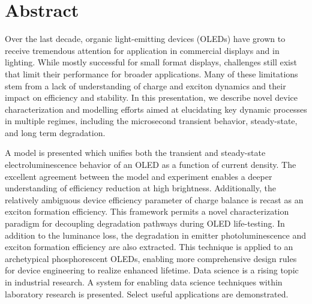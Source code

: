 \documentclass[../thesis.tex]{subfiles}
\begin{document}
\section*{Abstract}

Over the last decade, organic light-emitting devices (OLEDs) have grown to receive tremendous attention for application in commercial displays and in lighting.  While mostly successful for small format displays, challenges still exist that limit their performance for broader applications.  Many of these limitations stem from a lack of understanding of charge and exciton dynamics and their impact on efficiency and stability.  In this presentation, we describe novel device characterization and modelling efforts aimed at elucidating key dynamic processes in multiple regimes, including the microsecond transient behavior, steady-state, and long term degradation.  

A model is presented which unifies both the transient and steady-state electroluminescence behavior of an OLED as a function of current density.  The excellent agreement between the model and experiment enables a deeper understanding of efficiency reduction at high brightness.  Additionally, the relatively ambiguous device efficiency parameter of charge balance is recast as an exciton formation efficiency.  This framework permits a novel characterization paradigm for decoupling degradation pathways during OLED life-testing.  In addition to the luminance loss, the degradation in emitter photoluminescence and exciton formation efficiency are also extracted.  This technique is applied to an archetypical phosphorescent OLEDs, enabling more comprehensive design rules for device engineering to realize enhanced lifetime.  Data science is a rising topic in industrial research.  A system for enabling data science techniques within laboratory research is presented.  Select useful applications are demonstrated.
\end{document}
